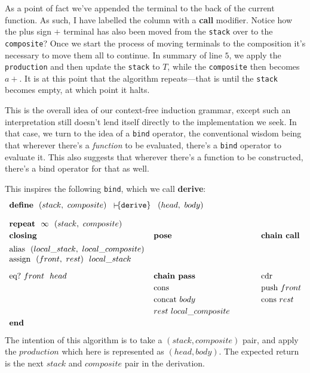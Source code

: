 \documentclass[twoside]{article}
\newcommand{\strong}[1]{{\bfseries #1}}
\newcommand{\bfmbox}[1]{\mbox{\bfseries #1}}
\newcommand{\tab}[1][1.125cm]{\hspace{#1}}
\newcommand{\col}[1][0ex]{& \hspace{#1}}
\newcommand{\cons}{\mbox{cons}}
\newcommand{\cdr}{\mbox{cdr}}
\newcommand{\eq}{\mbox{eq?}}
\newcommand{\push}{\mbox{push}}
\newcommand{\concat}{\mbox{concat}}
\newcommand{\reppose}[2]{\bfmbox{repeat}\ \ #1\ \ #2}
\newcommand{\tbind}[3]{\raisebox{#2}{\ensuremath{\vdash}}\hspace{#1}\{\texttt{#3}\}}
\newcommand{\deftbind}[1]{\tbind{-0.43ex}{-0.214ex}{#1}}
\newcommand{\alias}{\mbox{alias}}
\newcommand{\assign}{\mbox{assign}}
\begin{document}
As a point of fact we've appended the terminal to the back of the current function. As such, I have labelled the column
with a \strong{call} modifier. Notice how the plus sign $ + $ terminal has also been moved from the \texttt{stack} over
to the \texttt{composite}? Once we start the process of moving terminals to the composition it's necessary to move
them all to continue. In summary of line $ 5 $, we apply the \texttt{production} and then update the \texttt{stack}
to $ T $, while the \texttt{composite} then becomes $ a+ $. It is at this point that the algorithm repeats---that is
until the \texttt{stack} becomes empty, at which point it halts.

This is the overall idea of our context-free induction grammar, except such an interpretation still doesn't lend itself
directly to the implementation we seek. In that case, we turn to the idea of a \texttt{bind} operator, the conventional
wisdom being that wherever there's a \emph{function} to be evaluated, there's a \texttt{bind} operator to evaluate it.
This also suggests that wherever there's a function to be constructed, there's a bind operator for that as well.

This inspires the following \texttt{bind}, which we call \strong{derive}:
$$ \def\arraystretch{1.2}
\tab[0cm] \begin{array}{lll}
\bfmbox{define}\ \ (stack,\ composite)\tab[2ex] \deftbind{derive}\tab[2ex] (head,\ body)					\\[2ex]

\reppose{\infty}{(stack,\ composite)}												\\
\bfmbox{closing}	\col[-2.5cm] \bfmbox{pose}			\col[1cm] \bfmbox{chain call}				\\[0.5ex]

\alias\ \ (local\_stack,\ local\_composite)											\\[-0.5ex]
\assign\ \ (front,\ rest)\ \ local\_stack											\\[1.5ex]

\eq\ front\ \ head	\col[-2.5cm] \bfmbox{chain pass}		\col[1cm] \cdr						\\
			\col[-2.5cm] \cons				\col[1cm] \push\ front					\\
			\col[-2.5cm] \concat\ body			\col[1cm] \cons\ rest					\\
			\col[-2.5cm] rest\ local\_composite									\\
\bfmbox{end}
\end{array} $$
The intention of this algorithm is to take a $ (stack, composite) $ pair, and apply the $ production $ which here is
represented as $ (head, body) $. The expected return is the next $ stack $ and $ composite $ pair in the derivation.
\end{document}
